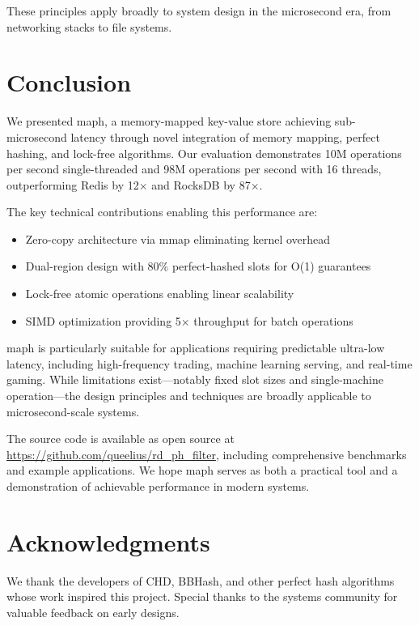 \documentclass[10pt,conference]{IEEEtran}
\begin{document}
These principles apply broadly to system design in the microsecond era, from networking stacks to file systems.

\section{Conclusion}
\label{sec:conclusion}

We presented maph, a memory-mapped key-value store achieving sub-microsecond latency through novel integration of memory mapping, perfect hashing, and lock-free algorithms. Our evaluation demonstrates 10M operations per second single-threaded and 98M operations per second with 16 threads, outperforming Redis by 12× and RocksDB by 87×.

The key technical contributions enabling this performance are:
\begin{itemize}
\item Zero-copy architecture via mmap eliminating kernel overhead
\item Dual-region design with 80\% perfect-hashed slots for O(1) guarantees
\item Lock-free atomic operations enabling linear scalability
\item SIMD optimization providing 5× throughput for batch operations
\end{itemize}

maph is particularly suitable for applications requiring predictable ultra-low latency, including high-frequency trading, machine learning serving, and real-time gaming. While limitations exist—notably fixed slot sizes and single-machine operation—the design principles and techniques are broadly applicable to microsecond-scale systems.

The source code is available as open source at \url{https://github.com/queelius/rd_ph_filter}, including comprehensive benchmarks and example applications. We hope maph serves as both a practical tool and a demonstration of achievable performance in modern systems.

\section*{Acknowledgments}

We thank the developers of CHD, BBHash, and other perfect hash algorithms whose work inspired this project. Special thanks to the systems community for valuable feedback on early designs.
\end{document}
